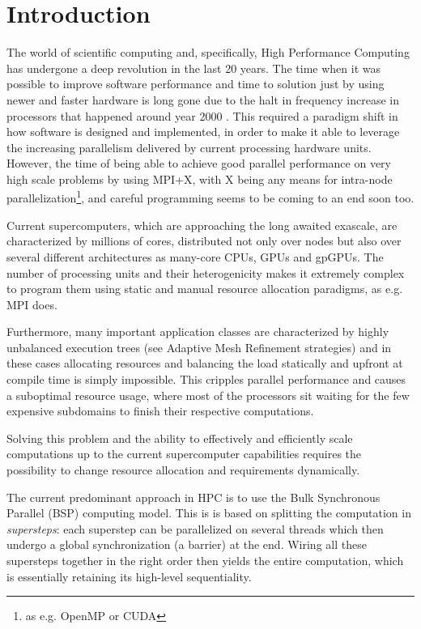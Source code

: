 
\section{Introduction}
The world of scientific computing and, specifically, High Performance Computing has undergone a deep revolution in the last 20 years.
The time when it was possible to improve software performance and time to solution just by using newer and faster hardware is long gone due to the halt in frequency increase in processors that happened around year 2000 .
This required a paradigm shift in how software is designed and implemented, in order to make it able to leverage the increasing parallelism delivered by current processing hardware units.
However, the time of being able to achieve good parallel performance on very high scale problems by using MPI+X, with X being any means for intra-node parallelization\footnote{as e.g. OpenMP or CUDA}, and careful programming seems to be coming to an end soon too\cite{heller2017hpx}.

Current supercomputers, which 	are approaching the long awaited exascale, are characterized by millions of cores, distributed not only over nodes but also over several different architectures as many-core CPUs, GPUs and gpGPUs.
The number of processing units and their heterogenicity makes it extremely complex to program them using static and manual resource allocation paradigms, as e.g. MPI does.

Furthermore, many important application classes are characterized by highly unbalanced execution trees (see Adaptive Mesh Refinement strategies) and in these cases allocating resources and balancing the load statically and upfront at compile time is simply impossible.
This cripples parallel performance and causes a suboptimal resource usage, where most of the processors sit waiting for the few expensive subdomains to finish their respective computations.

Solving this problem and the ability to effectively and efficiently scale computations up to the current supercomputer capabilities requires the possibility to change resource allocation and requirements dynamically.

The current predominant approach in HPC is to use the Bulk Synchronous Parallel (BSP)  computing model\cite{cheatham1996bulk}. This is is based on splitting the computation in \emph{supersteps}: each superstep can be parallelized on several threads which then undergo a global synchronization (a barrier) at the end. Wiring all these supersteps together in the right order then yields the entire computation, which is essentially retaining its high-level sequentiality.

